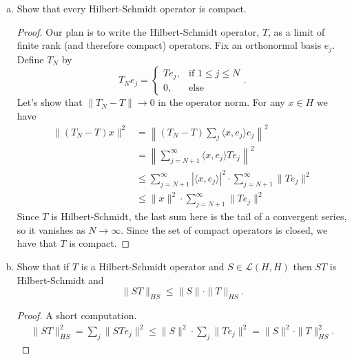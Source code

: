 \documentclass[11pt,letterpaper]{report}
\newcommand{\mcal}[1]{\mathcal{#1}}
\begin{document}
\begin{enumerate}[(a)]
	\item Show that every Hilbert-Schmidt operator is compact.
	\begin{proof}
		Our plan is to write the Hilbert-Schmidt operator, $T$, as a limit of finite rank (and therefore compact) operators. Fix an orthonormal basis $e_j$. Define $T_N$ by
		\begin{equation}\label{approx}
		T_Ne_j = \begin{cases}
			Te_j, &\text{if }1\leq j\leq N\\
			0,&\text{else}
		\end{cases}.
		\end{equation}
		Let's show that $\|T_N-T\|\to 0$ in the operator norm. For any $x\in H$ we have
		\begin{align*}
			\|(T_N - T)x\|^2 &= \left\|(T_N-T)\sum_j\langle x, e_j\rangle e_j\right\|^2\\
			&= \left\|\sum_{j=N+1}^\infty\langle x, e_j\rangle Te_j\right\|^2\\
			&\leq \sum_{j=N+1}^\infty |\langle x, e_j\rangle|^2\cdot \sum_{j=N+1}^\infty \|Te_j\|^2\\
			&\leq \|x\|^2\cdot \sum_{j=N+1}^\infty \|Te_j\|^2
		\end{align*}
		Since $T$ is Hilbert-Schmidt, the last sum here is the tail of a convergent series, so it vanishes as $N\to \infty$. Since the set of compact operators is closed, we have that $T$ is compact.
	\end{proof}

	\item Show that if $T$ is a Hilbert-Schmidt operator and $S\in \mcal{L}(H, H)$ then $ST$ is Hilbert-Schmidt and
	\[
	\|ST\|_{HS}\leq \|S\|\cdot \|T\|_{HS}.
	\]
	\begin{proof}
		A short computation.
		\begin{align*}
			\|ST\|_{HS}^2 = \sum_j\|STe_j\|^2 \leq \|S\|^2\cdot \sum_j\|Te_j\|^2 = \|S\|^2\cdot \|T\|_{HS}^2.
		\end{align*}
	\end{proof}


\end{enumerate}
\end{document}

